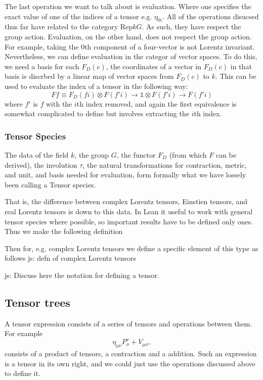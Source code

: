 \documentclass[a4paper, 11pt]{article}
\newcommand{\js}[1]{ {\color{magenta} js:  #1}}
\begin{document}
The last operation we want to talk about is evaluation. Where one specifies the exact value of 
one of the indices of a tensor e.g. $\eta_{0i}$. 
All of the operations disucsed thus far have related to the category $\mathrm{Rep} k G$. As such, 
they have respect the group action. Evaluation, on the other hand, does not respect the group action. 
For example, taking the $0$th component of a four-vector is not Lorentz invariant. 
Nevertheless, we can define evaluation in the categor of vector spaces. 
To do this, we need a basis for each $F_D(c)$, the coordinates of a vector in $F_D(c)$ in that basis 
is discrbed by a linear map of vector spaces from $F_D(c)$ to $k$. This can be used 
to evaluate the index of a tensor in the following way: 
\begin{equation} 
  F f \equiv F_D (f i) \otimes F (f' i) \to \mathbb{1} \otimes F (f' i) \to F (f' i)
\end{equation}
where $f'$ is $f$ with the $i$th index removed, and again the first equivalence is somewhat
complicated to define but involves extracting the $i$th index.

\subsubsection{Tensor Species}

The data of the field $k$, the group $G$, the functor $F_D$ (from which $F$ can be derived), the involution $\tau$, the natural
transformations for contraction, metric, and unit, and basis needed for evaluation, 
form formally what we have lossely been calling a Tensor species.

That is, the difference between complex Lorentz tensors, Einstien tensors, and real Lorentz tensors 
is down to this data. 
In Lean it useful to work with general tensor species where possible, so important results have 
to be defined only ones. Thus we make the following definition 
\begin{code}
\end{code}

Then for, e.g. complex Lorentz tensors we define a specific element of this type as follows 
\js{defn of complex Lorentz tensors}

\js{Discuss here the notation for defining a tensor.}
\subsection{Tensor trees}
A tensor expression consists of a series of tensors and operations between them. 
For example 
\begin{equation}
  \eta_{\mu \nu}P^\nu_\sigma+ V_{\mu \sigma},
\end{equation}
consists of a product of tensors, a contraction and a addition. 
Such an expression is a tensor in its own right, and we could just use the operations discussed above 
to define it. 
\end{document}
